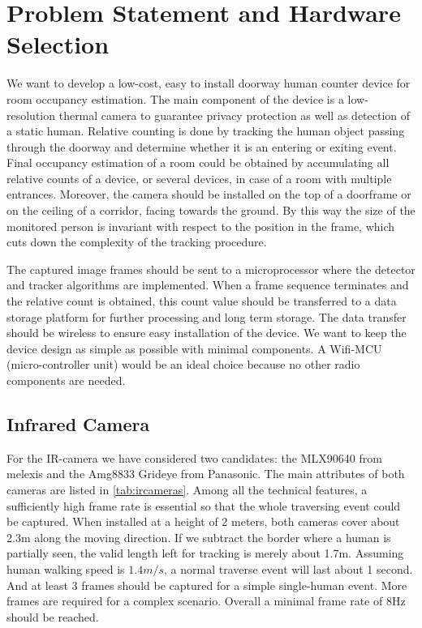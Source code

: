 \chapter{Problem Statement and Hardware Selection} \label{ch:hardware}
We want to develop a low-cost, easy to install doorway human counter device for room occupancy estimation. The main component of the device is a low-resolution thermal camera to guarantee privacy protection as well as detection of a static human. Relative counting is done by tracking the human object passing through the doorway and determine whether it is an entering or exiting event. Final occupancy estimation of a room could be obtained by accumulating all relative counts of a device, or several devices, in case of a room with multiple entrances. Moreover, the camera should be installed on the top of a doorframe or on the ceiling of a corridor, facing towards the ground. By this way the size of the monitored person is invariant with respect to the position in the frame, which cuts down the complexity of the tracking procedure.

The captured image frames should be sent to a microprocessor where the detector and tracker algorithms are implemented. When a frame sequence terminates and the relative count is obtained, this count value should be transferred to a data storage platform for further processing and long term storage. The data transfer should be wireless to ensure easy installation of the device. We want to keep the device design as simple as possible with minimal components. A Wifi-MCU (micro-controller unit) would be an ideal choice because no other radio components are needed.
\section{Infrared Camera}
For the IR-camera we have considered two candidates: the MLX90640 from melexis and the Amg8833 Grideye from Panasonic. The main attributes of both cameras are listed in \autoref{tab:ircameras}. Among all the technical features, a sufficiently high frame rate is essential so that the whole traversing event could be captured. When installed at a height of 2 meters, both cameras cover about 2.3m along the moving direction. If we subtract the border where a human is partially seen, the valid length left for tracking is merely about 1.7m. Assuming human walking speed is $1.4m/s$, a normal traverse event will last about 1 second. And at least 3 frames should be captured for a simple single-human event. More frames are required for a complex scenario. Overall a minimal frame rate of 8Hz should be reached.

